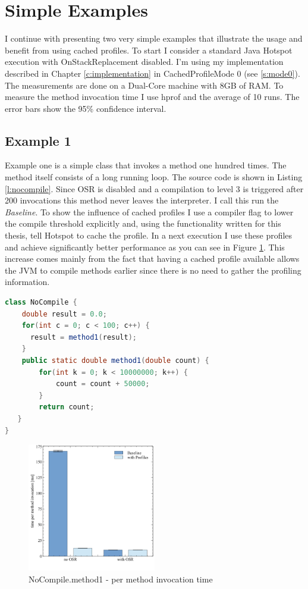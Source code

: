 \section{Simple Examples}

I continue with presenting two very simple examples that illustrate the usage and benefit from using cached profiles. To start I consider a standard Java Hotspot execution with OnStackReplacement disabled. I'm using my implementation described in Chapter \ref{c:implementation} in CachedProfileMode 0 (see \ref{s:mode0}).
The measurements are done on a Dual-Core machine with 8GB of RAM. To measure the method invocation time I use hprof and the average of 10 runs. The error bars show the 95\% confidence interval.
\subsection{Example 1}
\label{s:ex1}
Example one is a simple class that invokes a method one hundred times. The method itself consists of a long running loop. The source code is shown in Listing \ref{l:nocompile}.
Since OSR is disabled and a compilation to level 3 is triggered after 200 invocations this method never leaves the interpreter. I call this run the \textit{Baseline}.
To show the influence of cached profiles I use a compiler flag to lower the compile threshold explicitly and, using the functionality written for this thesis, tell Hotspot to cache the profile.
In a next execution I use these profiles and achieve significantly better performance as you can see in Figure \ref{f:nocompile}.
This increase comes mainly from the fact that having a cached profile available allows the JVM to compile methods earlier since there is no need to gather the profiling information.
\begin{lstlisting}[float,caption=Simple method that does not get compiled,label=l:nocompile,language=Java]
class NoCompile {
    double result = 0.0;
    for(int c = 0; c < 100; c++) {
      result = method1(result);
    }
    public static double method1(double count) {
        for(int k = 0; k < 10000000; k++) {
            count = count + 50000;
        }
        return count;
   }
}
\end{lstlisting}
\begin{figure}[ht]
  \begin{center}
    \centering
    \includegraphics[width=0.5\textwidth]{figures/nocompile.png}
    \caption{NoCompile.method1 - per method invocation time}
    \label{f:nocompile}
  \end{center}
\end{figure}
